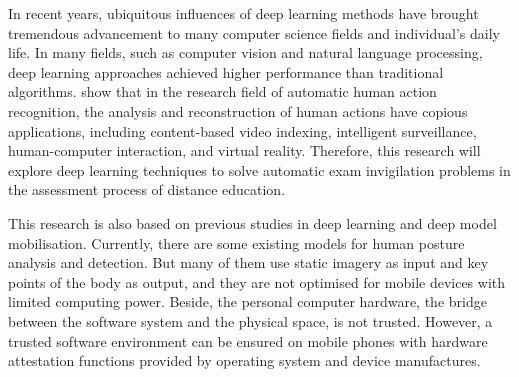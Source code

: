 In recent years, ubiquitous influences of deep learning methods have brought tremendous advancement to many computer science fields and individual's daily life. 
In many fields, such as computer vision and natural language processing, deep learning approaches achieved higher performance than traditional algorithms.
\citet{mccay2020abnormal} show that in the research field of automatic human action recognition, the analysis and reconstruction of human actions have copious applications, including content-based video indexing, intelligent surveillance, human-computer interaction, and virtual reality.
Therefore, this research will explore deep learning techniques to solve automatic exam invigilation problems in the assessment process of distance education.

This research is also based on previous studies in deep learning and deep model mobilisation.
Currently, there are some existing models for human posture analysis and detection.
But many of them use static imagery as input and key points of the body as output, and they are not optimised for mobile devices with limited computing power.
Beside, the personal computer hardware, the bridge between the software system and the physical space, is not trusted.
However, a trusted software environment can be ensured on mobile phones with hardware attestation functions provided by operating system and device manufactures.
